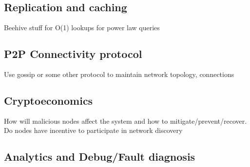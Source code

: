 \subsection{Replication and caching}
Beehive stuff for O(1) lookups for power law queries

\subsection{P2P Connectivity protocol}
Use gossip or some other protocol to maintain network topology, connections

\subsection{Cryptoeconomics}
How will malicious nodes affect the system and how to mitigate/prevent/recover. Do nodes have incentive to participate in network discovery

\subsection{Analytics and Debug/Fault diagnosis}
